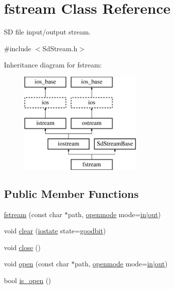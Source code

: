 \hypertarget{classfstream}{\section{fstream Class Reference}
\label{classfstream}
}


S\-D file input/output stream.  




{\ttfamily \#include $<$Sd\-Stream.\-h$>$}

Inheritance diagram for fstream\-:\begin{figure}[H]
\begin{center}
\leavevmode
\includegraphics[height=5.000000cm]{classfstream}
\end{center}
\end{figure}
\subsection*{Public Member Functions}
\begin{DoxyCompactItemize}
\item 
\hyperlink{classfstream_abc14f38c17bf44fcecc1e37b0ac612f8}{fstream} (const char $\ast$path, \hyperlink{classios__base_a97a503456f60758f2c110f99b0ce0815}{openmode} mode=\hyperlink{classios__base_a371ab336bfce00a620526ba26f9be813}{in}$|$\hyperlink{classios__base_a5300f1b3e0fe12cc7c484ab89f8bba83}{out})
\item 
void \hyperlink{classfstream_a1978eec476ebfeed466b5ce921853720}{clear} (\hyperlink{classios__base_a67209c853f091390e1a08ac0b043fe11}{iostate} state=\hyperlink{classios__base_ada0c8aa0797472d458523a3c2c475cdb}{goodbit})
\item 
void \hyperlink{classfstream_a5ae591df94fc66ccb85cbb6565368bca}{close} ()
\item 
void \hyperlink{classfstream_af61417d70e1106ce7f88965d684134d4}{open} (const char $\ast$path, \hyperlink{classios__base_a97a503456f60758f2c110f99b0ce0815}{openmode} mode=\hyperlink{classios__base_a371ab336bfce00a620526ba26f9be813}{in}$|$\hyperlink{classios__base_a5300f1b3e0fe12cc7c484ab89f8bba83}{out})
\item 
bool \hyperlink{classfstream_a2f57f54d8c03b615bb31eee091d8a88a}{is\-\_\-open} ()
\end{DoxyCompactItemize}
